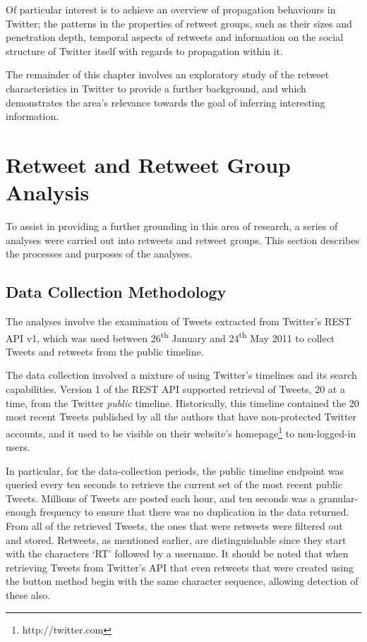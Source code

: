Of particular interest is to achieve an overview of propagation behaviours in Twitter; the patterns in the properties of retweet groups, such as their sizes and penetration depth, temporal aspects of retweets and information on the social structure of Twitter itself with regards to propagation within it.

The remainder of this chapter involves an exploratory study of the retweet characteristics in Twitter to provide a further background, and which demonstrates the area's relevance towards the goal of inferring interesting information.


\section{Retweet and Retweet Group Analysis}
To assist in providing a further grounding in this area of research, a series of analyses were carried out into retweets and retweet groups. This section describes the processes and purposes of the analyses.


\subsection{Data Collection Methodology}
The analyses involve the examination of Tweets extracted from Twitter's REST API v1, which was used between 26\textsuperscript{th} January and 24\textsuperscript{th} May 2011 to collect Tweets and retweets from the public timeline.

The data collection involved a mixture of using Twitter's timelines and its search capabilities. Version 1 of the REST API supported retrieval of Tweets, 20 at a time, from the Twitter \textit{public} timeline. Historically, this timeline contained the 20 most recent Tweets published by all the authors that have non-protected Twitter accounts, and it used to be visible on their website's homepage\footnote{http://twitter.com} to non-logged-in users.

In particular, for the data-collection periods, the public timeline endpoint was queried every ten seconds to retrieve the current set of the most recent public Tweets. Millions of Tweets are posted each hour, and ten seconds was a granular-enough frequency to ensure that there was no duplication in the data returned. From all of the retrieved Tweets, the ones that were retweets were filtered out and stored. Retweets, as mentioned earlier, are distinguishable since they start with the characters `RT' followed by a username. It should be noted that when retrieving Tweets from Twitter's API that even retweets that were created using the button method begin with the same character sequence, allowing detection of these also.

